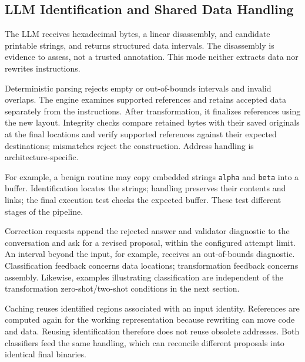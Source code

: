 \subsection{LLM Identification and Shared Data Handling}
The LLM receives hexadecimal bytes, a linear disassembly, and candidate
printable strings, and returns structured data intervals. The disassembly
is evidence to assess, not a trusted annotation. This mode neither
extracts data nor rewrites instructions.

Deterministic parsing rejects empty or out-of-bounds intervals and invalid
overlaps. The engine examines supported references and retains accepted
data separately from the instructions. After transformation, it finalizes
references using the new layout. Integrity checks compare retained bytes
with their saved originals at the final locations and verify supported
references against their expected destinations; mismatches reject the
construction. Address handling is architecture-specific.

For example, a benign routine may copy embedded strings \texttt{alpha}
and \texttt{beta} into a buffer. Identification locates the strings;
handling preserves their contents and links; the final execution test
checks the expected buffer. These test different stages of the pipeline.

Correction requests append the rejected answer and validator diagnostic
to the conversation and ask for a revised proposal, within the configured
attempt limit. An interval beyond the input, for example, receives an
out-of-bounds diagnostic. Classification feedback concerns data locations;
transformation feedback concerns assembly. Likewise, examples illustrating
classification are independent of the transformation zero-shot/two-shot
conditions in the next section.

Caching reuses identified regions associated with an input identity.
References are computed again for the working representation because
rewriting can move code and data. Reusing identification therefore does
not reuse obsolete addresses. Both classifiers feed the same handling,
which can reconcile different proposals into identical final binaries.
